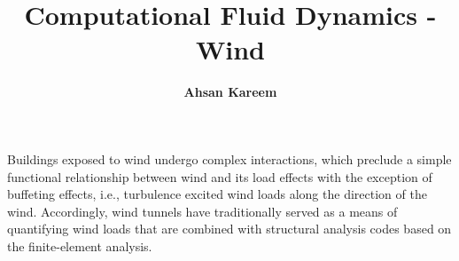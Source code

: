 %
%
%


%
%
%
%
%
%
%
%

\title{Computational Fluid Dynamics - Wind}
\author{
    \textbf{Ahsan Kareem}}
\tocauthor{}
%
%
\maketitle

Buildings exposed to wind undergo complex interactions, which preclude a simple functional relationship between wind and its load effects with the exception of buffeting effects, i.e., turbulence excited wind loads along the direction of the wind. Accordingly, wind tunnels have traditionally served as a means of quantifying wind loads that are combined with structural analysis codes based on the finite-element analysis. 

